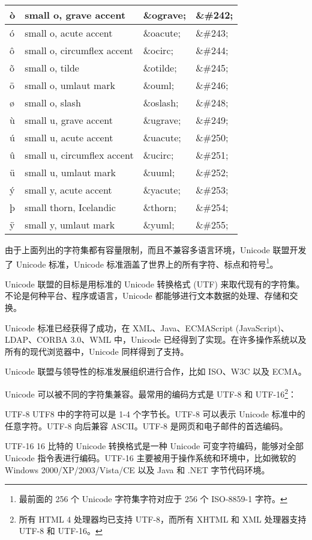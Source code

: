 \begin{longtable}{|p{60pt}|p{120pt}|p{60pt}|p{60pt}|}
ò	&small o, grave accent			&\&ograve;	&\&\#242;\\
\hline
ó	&small o, acute accent			&\&oacute;	&\&\#243;\\
\hline
ô	&small o, circumflex accent		&\&ocirc;		&\&\#244;\\
\hline
õ	&small o, tilde				&\&otilde;	&\&\#245;\\
\hline
ö	&small o, umlaut mark			&\&ouml;		&\&\#246;\\
\hline
ø	&small o, slash				&\&oslash;	&\&\#248;\\
\hline
ù	&small u, grave accent			&\&ugrave;	&\&\#249;\\
\hline
ú	&small u, acute accent			&\&uacute;	&\&\#250;\\
\hline
û	&small u, circumflex accent		&\&ucirc;		&\&\#251;\\
\hline
ü	&small u, umlaut mark			&\&uuml;		&\&\#252;\\
\hline
ý	&small y, acute accent			&\&yacute;	&\&\#253;\\
\hline
þ	&small thorn, Icelandic			&\&thorn;	&\&\#254;\\
\hline
ÿ	&small y, umlaut mark			&\&yuml;		&\&\#255;\\
\hline
\end{longtable}

由于上面列出的字符集都有容量限制，而且不兼容多语言环境，Unicode 联盟开发了 Unicode 标准，Unicode 标准涵盖了世界上的所有字符、标点和符号\footnote{最前面的 256 个 Unicode 字符集字符对应于 256 个 ISO-8859-1 字符。}。

Unicode 联盟的目标是用标准的 Unicode 转换格式 (UTF) 来取代现有的字符集。不论是何种平台、程序或语言，Unicode 都能够进行文本数据的处理、存储和交换。

Unicode 标准已经获得了成功，在 XML、Java、ECMAScript (JavaScript)、LDAP、CORBA 3.0、WML 中，Unicode 已经得到了实现。在许多操作系统以及所有的现代浏览器中，Unicode 同样得到了支持。

Unicode 联盟与领导性的标准发展组织进行合作，比如 ISO、W3C 以及 ECMA。

Unicode 可以被不同的字符集兼容。最常用的编码方式是 UTF-8 和 UTF-16\footnote{所有 HTML 4 处理器均已支持 UTF-8，而所有 XHTML 和 XML 处理器支持 UTF-8 和 UTF-16。}：

\begin{compactitem}
\item UTF-8
UTF8 中的字符可以是 1-4 个字节长。UTF-8 可以表示 Unicode 标准中的任意字符。UTF-8 向后兼容 ASCII。UTF-8 是网页和电子邮件的首选编码。
\item UTF-16
16 比特的 Unicode 转换格式是一种 Unicode 可变字符编码，能够对全部 Unicode 指令表进行编码。UTF-16 主要被用于操作系统和环境中，比如微软的 Windows 2000/XP/2003/Vista/CE 以及 Java 和 .NET 字节代码环境。
\end{compactitem}


